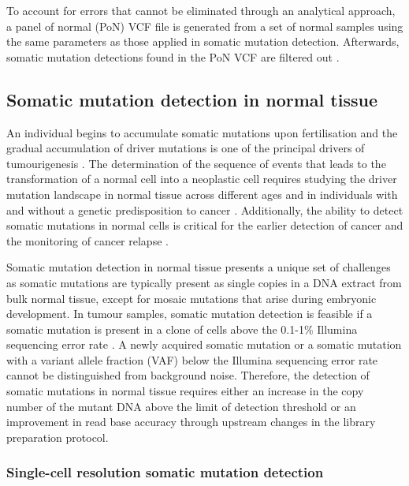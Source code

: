 To account for errors that cannot be eliminated through an analytical approach, a panel of normal (PoN) VCF file is generated from a set of normal samples using the same parameters as those applied in somatic mutation detection. Afterwards, somatic mutation detections found in the PoN VCF are filtered out \cite{Cibulskis2013-gw}.

\subsection{Somatic mutation detection in normal tissue}
\label{sec:somatic_mutation_detection_in_normal_tissue}

An individual begins to accumulate somatic mutations upon fertilisation and the gradual accumulation of driver mutations is one of the principal drivers of tumourigenesis \cite{Stratton2009-of}. The determination of the sequence of events that leads to the transformation of a normal cell into a neoplastic cell requires studying the driver mutation landscape in normal tissue across different ages and in individuals with and without a genetic predisposition to cancer \cite{Martincorena2015-io}. Additionally, the ability to detect somatic mutations in normal cells is critical for the earlier detection of cancer and the monitoring of cancer relapse \cite{Newman2014-qq, Newman2016-cy}.

Somatic mutation detection in normal tissue presents a unique set of challenges as somatic mutations are typically present as single copies in a DNA extract from bulk normal tissue, except for mosaic mutations that arise during embryonic development. In tumour samples, somatic mutation detection is feasible if a somatic mutation is present in a clone of cells above the 0.1-1\% Illumina sequencing error rate \cite{Cibulskis2013-gw}. A newly acquired somatic mutation or a somatic mutation with a variant allele fraction (VAF) below the Illumina sequencing error rate cannot be distinguished from background noise. Therefore, the detection of somatic mutations in normal tissue requires either an increase in the copy number of the mutant DNA above the limit of detection threshold or an improvement in read base accuracy through upstream changes in the library preparation protocol.

\subsubsection{Single-cell resolution somatic mutation detection}

